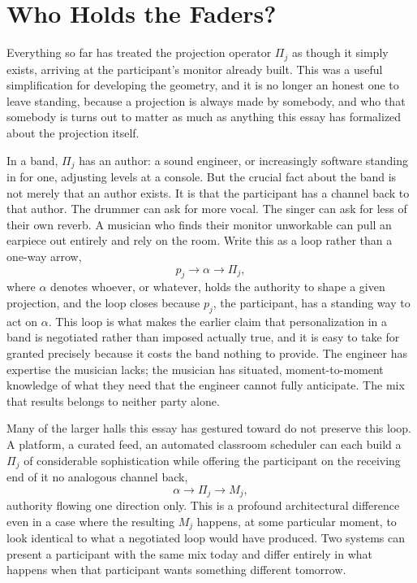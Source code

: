 \documentclass[12pt]{article}
\begin{document}
\section{Who Holds the Faders?}

Everything so far has treated the projection operator $\Pi_j$ as though it simply exists, arriving at the participant's monitor already built. This was a useful simplification for developing the geometry, and it is no longer an honest one to leave standing, because a projection is always made by somebody, and who that somebody is turns out to matter as much as anything this essay has formalized about the projection itself.

In a band, $\Pi_j$ has an author: a sound engineer, or increasingly software standing in for one, adjusting levels at a console. But the crucial fact about the band is not merely that an author exists. It is that the participant has a channel back to that author. The drummer can ask for more vocal. The singer can ask for less of their own reverb. A musician who finds their monitor unworkable can pull an earpiece out entirely and rely on the room. Write this as a loop rather than a one-way arrow,
\[
p_j \longrightarrow \alpha \longrightarrow \Pi_j,
\]
where $\alpha$ denotes whoever, or whatever, holds the authority to shape a given projection, and the loop closes because $p_j$, the participant, has a standing way to act on $\alpha$. This loop is what makes the earlier claim that personalization in a band is negotiated rather than imposed actually true, and it is easy to take for granted precisely because it costs the band nothing to provide. The engineer has expertise the musician lacks; the musician has situated, moment-to-moment knowledge of what they need that the engineer cannot fully anticipate. The mix that results belongs to neither party alone.

Many of the larger halls this essay has gestured toward do not preserve this loop. A platform, a curated feed, an automated classroom scheduler can each build a $\Pi_j$ of considerable sophistication while offering the participant on the receiving end of it no analogous channel back,
\[
\alpha \longrightarrow \Pi_j \longrightarrow M_j,
\]
authority flowing one direction only. This is a profound architectural difference even in a case where the resulting $M_j$ happens, at some particular moment, to look identical to what a negotiated loop would have produced. Two systems can present a participant with the same mix today and differ entirely in what happens when that participant wants something different tomorrow.
\end{document}
